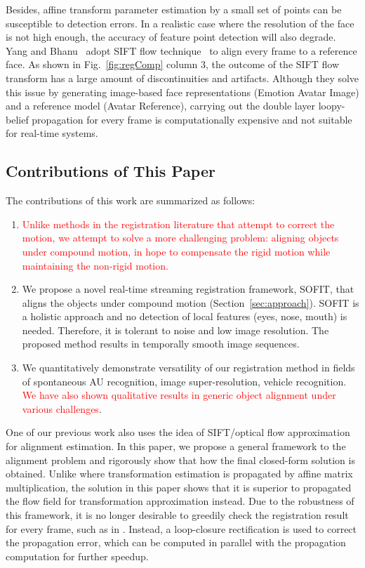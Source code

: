 \documentclass[10pt,journal]{IEEEtran}
\newcommand{\Songfan}[1]{\textcolor{red}{#1}}
\begin{document}
Besides, affine transform parameter estimation by a small set of points can be susceptible to detection errors. In a realistic case where the resolution of the face is not high enough, the accuracy of feature point detection will also degrade. Yang and Bhanu~\cite{Yang_SMCB12} adopt SIFT flow technique~\cite{Liu_PAMI11} to align every frame to a reference face. As shown in Fig.~\ref{fig:regComp} column 3, the outcome of the SIFT flow transform has a large amount of discontinuities and artifacts. Although they solve this issue by generating image-based face representations (Emotion Avatar Image) and a reference model (Avatar Reference), carrying out the double layer loopy-belief propagation for every frame is computationally expensive and not suitable for real-time systems.

\subsection{\label{sec:contribution}Contributions of This Paper}

The contributions of this work are summarized as follows:

\begin{enumerate}
\item \Songfan{Unlike methods in the registration literature that attempt to correct the motion, we attempt to solve a more challenging problem: aligning objects under compound motion, in hope to compensate the rigid motion while maintaining the non-rigid motion. }
\item We propose a novel real-time streaming registration framework, SOFIT, that aligns the objects under compound motion (Section~\ref{sec:approach}). SOFIT is a holistic approach and no detection of local features (eyes, nose, mouth) is needed. Therefore, it is tolerant to noise and low image resolution. The proposed method results in temporally smooth image sequences.
\item We quantitatively demonstrate versatility of our registration method in fields of spontaneous AU recognition, image super-resolution, vehicle recognition. \Songfan{We have also shown qualitative results in generic object alignment under various challenges}.
\end{enumerate}

One of our previous work \cite{Yang_FG13} also uses the idea of SIFT/optical flow approximation for alignment estimation. In this paper, we propose a general framework to the alignment problem and rigorously show that how the final closed-form solution is obtained. Unlike \cite{Yang_FG13} where transformation estimation is propagated by affine matrix multiplication, the solution in this paper shows that it is superior to propagated the flow field for transformation approximation instead. Due to the robustness of this framework, it is no longer desirable to greedily check the registration result for every frame, such as in \cite{Yang_FG13}. Instead, a loop-closure rectification is used to correct the propagation error, which can be computed in parallel with the propagation computation for further speedup. 
\end{document}
